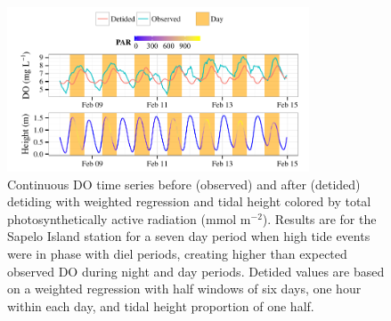 \documentclass[letterpaper,12pt,oneside]{article}\usepackage[]{graphicx}\usepackage[]{color}
\newenvironment{knitrout}{}{} %
\begin{document}
\centering\vspace*{\fill}
\begin{knitrout}
\color{fgcolor}\begin{figure}[!ht]


{\centering \includegraphics[width=0.8\textwidth]{figure/phase_in} 

}

\caption[Continuous \ac{DO} time series before (observed) and after (detided) detiding with weighted regression and tidal height colored by total photosynthetically active radiation (mmol m$^{-2}$)]{Continuous \ac{DO} time series before (observed) and after (detided) detiding with weighted regression and tidal height colored by total photosynthetically active radiation (mmol m$^{-2}$). Results are for the Sapelo Island station for a seven day period when high tide events were in phase with diel periods, creating higher than expected observed \ac{DO} during night and day periods. Detided values are based on a weighted regression with half windows of six days, one hour within each day, and tidal height proportion of one half.\label{fig:phase_in}}
\end{figure}


\end{knitrout}
\vfill
\clearpage
\end{document}
